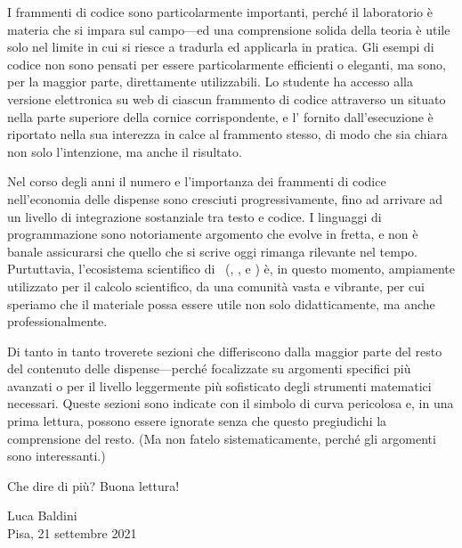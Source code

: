 I frammenti di codice sono particolarmente importanti, perché il laboratorio
è materia che si impara sul campo---ed una comprensione solida della teoria
è utile solo nel limite in cui si riesce a tradurla ed applicarla in pratica.
Gli esempi di codice non sono pensati per essere particolarmente efficienti
o eleganti, ma sono, per la maggior parte, direttamente utilizzabili.
Lo studente ha accesso alla versione elettronica su web di ciascun frammento
di codice attraverso un  situato nella parte superiore della
cornice corrispondente, e l' fornito dall'esecuzione è riportato
nella sua interezza in calce al frammento stesso, di modo che sia chiara
non solo l'intenzione, ma anche il risultato.

\begin{snippet}[htb!]
  \bigskip %
\end{snippet}

Nel corso degli anni il numero e l'importanza dei frammenti di codice nell'economia
delle dispense sono cresciuti progressivamente, fino ad arrivare ad un livello
di integrazione sostanziale tra testo e codice. I linguaggi di programmazione
sono notoriamente argomento che evolve in fretta, e non è banale assicurarsi che
quello che si scrive oggi rimanga rilevante nel tempo. Purtuttavia, l'ecosistema
scientifico di \python\ (\numpy, \scipy, e \matplotlib) è, in questo momento,
ampiamente utilizzato per il calcolo scientifico, da una comunità vasta e vibrante,
per cui speriamo che il materiale possa essere utile non solo didatticamente,
ma anche professionalmente.

\danger%
Di tanto in tanto troverete sezioni che differiscono dalla maggior parte del
resto del contenuto delle dispense---perché focalizzate su argomenti
specifici più avanzati o per il livello leggermente più sofisticato degli
strumenti matematici necessari. Queste sezioni sono indicate con il simbolo
di curva pericolosa e, in una prima lettura, possono essere ignorate senza
che questo pregiudichi la comprensione del resto. (Ma non fatelo
sistematicamente, perché gli argomenti sono interessanti.)

\bigskip

\noindent Che dire di più? Buona lettura!

\bigskip

{\flushright Luca Baldini\\ \flushright Pisa, 21 settembre 2021\\}
